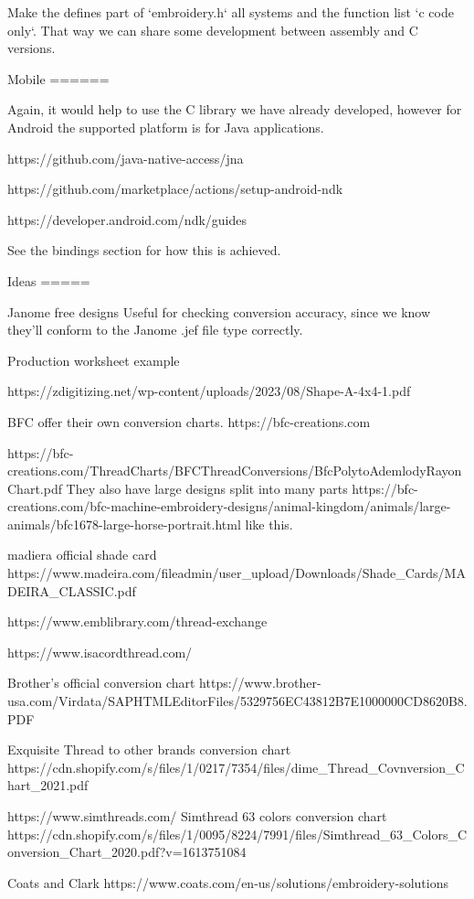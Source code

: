 \documentclass[a4paper]{report}
\begin{document}
{{{{{Make the defines part of `embroidery.h` all systems and the function list
`c code only`. That way we can share some development between assembly and C versions.

Mobile
======

Again, it would help to use the C library we have already developed,
however for Android the supported platform is for Java applications.

https://github.com/java-native-access/jna

https://github.com/marketplace/actions/setup-android-ndk

https://developer.android.com/ndk/guides

See the bindings section for how this is achieved.

Ideas
=====

Janome free designs \citep{janomeFreeDesigns}
Useful for checking conversion accuracy, since we know they'll conform to the
Janome .jef file type correctly.

Production worksheet example

https://zdigitizing.net/wp-content/uploads/2023/08/Shape-A-4x4-1.pdf

BFC offer their own conversion charts.
https://bfc-creations.com

https://bfc-creations.com/ThreadCharts/BFCThreadConversions/BfcPolytoAdemlodyRayonChart.pdf
They also have large designs split into many parts
https://bfc-creations.com/bfc-machine-embroidery-designs/animal-kingdom/animals/large-animals/bfc1678-large-horse-portrait.html
like this.

madiera official shade card
https://www.madeira.com/fileadmin/user_upload/Downloads/Shade_Cards/MADEIRA_CLASSIC.pdf

https://www.emblibrary.com/thread-exchange

https://www.isacordthread.com/

Brother's official conversion chart
https://www.brother-usa.com/Virdata/SAPHTMLEditorFiles/5329756EC43812B7E1000000CD8620B8.PDF

Exquisite Thread to other brands conversion chart
https://cdn.shopify.com/s/files/1/0217/7354/files/dime_Thread_Covnversion_Chart_2021.pdf

https://www.simthreads.com/
Simthread 63 colors conversion chart
https://cdn.shopify.com/s/files/1/0095/8224/7991/files/Simthread_63_Colors_Conversion_Chart_2020.pdf?v=1613751084

Coats and Clark https://www.coats.com/en-us/solutions/embroidery-solutions

}}}}}
\end{document}
